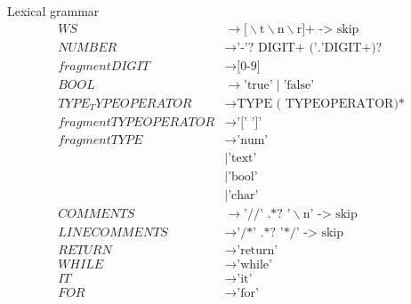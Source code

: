 Lexical grammar
\begin{align*}
    WS                      & \to \text{[}\backslash \text{t} \backslash \text{n} \backslash \text{r]+ -> skip}     \\
    NUMBER                  & \to \text{'-'? DIGIT+ ('.'DIGIT+)?}                                                   \\
    fragment DIGIT          & \to \text{[0-9]}                                                                      \\
    BOOL                    & \to \text{'true'} \mid \text{'false'}                                                 \\
    TYPE_TYPEOPERATOR       & \to \text{TYPE ( TYPEOPERATOR)*}                                                      \\
    fragment TYPEOPERATOR   & \to \text{'[' ']'}                                                                    \\
    fragment TYPE           & \to \text{'num'}                                                                      \\
                            & \mid \text{'text'}                                                                    \\
                            & \mid \text{'bool'}                                                                    \\
                            & \mid \text{'char'}                                                                    \\
    COMMENTS                & \to \text{'//' .*? '} \backslash \text{n' -> skip}                                    \\
    LINECOMMENTS            & \to \text{'/*' .*? '*/' -> skip}                                                      \\
    RETURN                  & \to \text{'return'}                                                                   \\
    WHILE                   & \to \text{'while'}                                                                    \\
    IT                      & \to \text{'it'}                                                                       \\
    FOR                     & \to \text{'for'}                                                                      \\

\end{align*}
